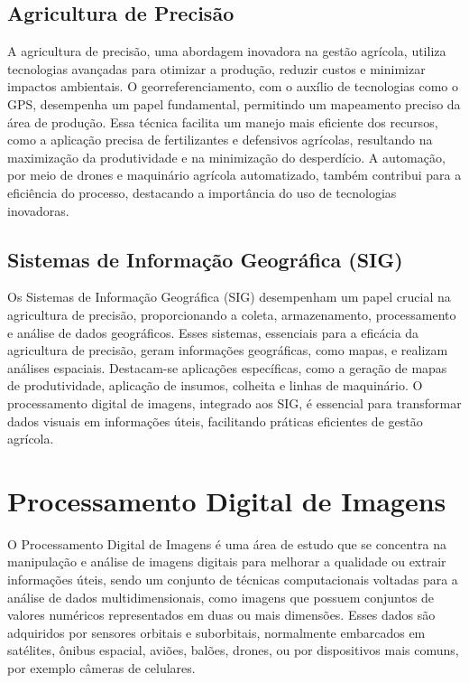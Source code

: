 \documentclass[conference]{IEEEtran}
\begin{document}
\subsection{Agricultura de Precisão}

A agricultura de precisão, uma abordagem inovadora na gestão agrícola, utiliza tecnologias avançadas 
para otimizar a produção, reduzir custos e minimizar impactos ambientais. O georreferenciamento, 
com o auxílio de tecnologias como o GPS, desempenha um papel fundamental, permitindo um mapeamento 
preciso da área de produção. Essa técnica facilita um manejo mais eficiente dos recursos, como a 
aplicação precisa de fertilizantes e defensivos agrícolas, resultando na maximização da produtividade 
e na minimização do desperdício. A automação, por meio de drones e maquinário agrícola automatizado, 
também contribui para a eficiência do processo, destacando a importância do uso de tecnologias inovadoras.

\subsection{Sistemas de Informação Geográfica (SIG)}

Os Sistemas de Informação Geográfica (SIG) desempenham um papel crucial na agricultura de precisão, 
proporcionando a coleta, armazenamento, processamento e análise de dados geográficos. 
Esses sistemas, essenciais para a eficácia da agricultura de precisão, geram informações geográficas, 
como mapas, e realizam análises espaciais. Destacam-se aplicações específicas, como a geração 
de mapas de produtividade, aplicação de insumos, colheita e linhas de maquinário. 
O processamento digital de imagens, integrado aos SIG, é essencial para transformar dados visuais 
em informações úteis, facilitando práticas eficientes de gestão agrícola.

\section{Processamento Digital de Imagens}

O Processamento Digital de Imagens é uma área de estudo que se concentra na manipulação e análise de imagens 
digitais para melhorar a qualidade ou extrair informações úteis, sendo um conjunto de técnicas computacionais 
voltadas para a análise de dados multidimensionais, como imagens que possuem conjuntos de valores numéricos 
representados em duas ou mais dimensões. Esses dados são adquiridos por sensores orbitais e suborbitais, 
normalmente embarcados em satélites, ônibus espacial, aviões, balões, drones, ou por dispositivos mais comuns, 
por exemplo câmeras de celulares. 
\end{document}
